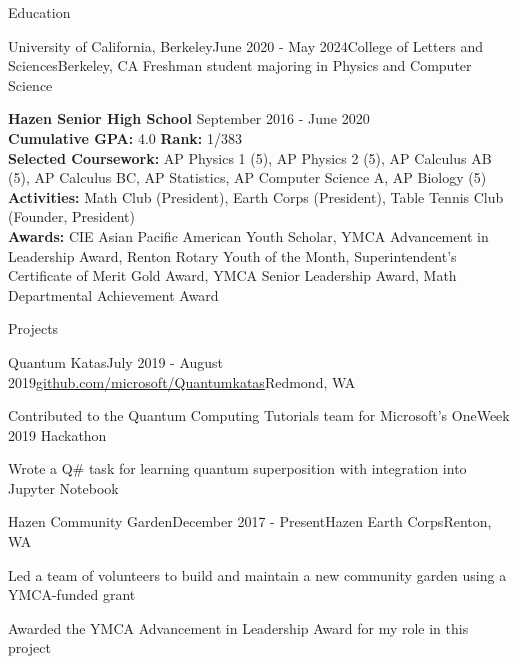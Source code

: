 \documentclass{resume} %
\begin{document}
\begin{rSection}{Education}
    \begin{rSubsection}{University of California, Berkeley}{June 2020 - May 2024}{College of Letters and Sciences}{Berkeley, CA}
        Freshman student majoring in Physics and Computer Science
        \end{rSubsection}

{\bf Hazen Senior High School} \hfill {September 2016 - June 2020}\\
{\bf Cumulative GPA:} 4.0 {\bf Rank:} 1/383 \smallskip \\
{\bf Selected Coursework:} AP Physics 1 (5), AP Physics 2 (5), AP Calculus AB (5), AP Calculus BC, AP Statistics, AP Computer Science A, AP Biology (5)\\
{\bf Activities:} Math Club (President), Earth Corps (President), Table Tennis Club (Founder, President)\\
{\bf Awards:} CIE Asian Pacific American Youth Scholar, YMCA Advancement in Leadership Award,  Renton Rotary Youth of the Month, Superintendent's Certificate of Merit Gold Award, YMCA Senior Leadership Award, Math Departmental Achievement Award

\end{rSection}


\begin{rSection}{Projects}

\begin{rSubsection}{Quantum Katas}{July 2019 - August 2019}{\href{https://github.com/microsoft/QuantumKatas}{github.com/microsoft/Quantumkatas}}{Redmond, WA}
\item Contributed to the Quantum Computing Tutorials team for Microsoft's OneWeek 2019 Hackathon
\item Wrote a Q\# task for learning quantum superposition with integration into Jupyter Notebook
\end{rSubsection}

\begin{rSubsection}{Hazen Community Garden}{December 2017 - Present}{Hazen Earth Corps}{Renton, WA}
\item Led a team of volunteers to build and maintain a new community garden using a YMCA-funded grant
\item Awarded the YMCA Advancement in Leadership Award for my role in this project
\end{rSubsection}

\end{rSection}
\end{document}
